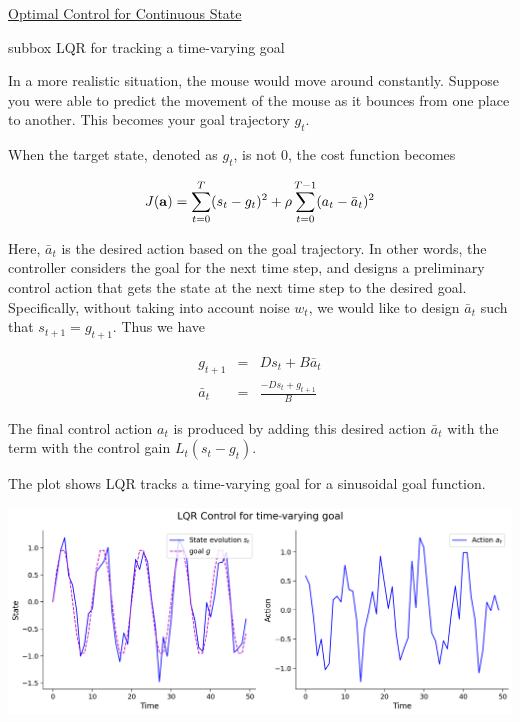\begin{textbox}{\href{https://compneuro.neuromatch.io/tutorials/W3D3_OptimalControl/student/W3D3_Tutorial2.html}{Optimal Control for Continuous State}}


\begin{subbox}{subbox}{ LQR for tracking a time-varying goal}
\scriptsize

In a more realistic situation, the mouse would move around constantly. Suppose you were able to predict the movement of the mouse as it bounces from one place to another. This becomes your goal trajectory $g_t$.

When the target state, denoted as $g_t$, is not $0$, the cost function becomes

\begin{equation*}
J({\bf a}) = \sum_{t = 0}^{T} (s_{t}- g_t) ^2 + \rho \sum_{t=0}^{T-1}(a_{t}-\bar a_t)^2
\end{equation*}

Here, $\bar a_t$ is the desired action based on the goal trajectory. In other words, the controller considers the goal for the next time step, and designs a preliminary control action that gets the state at the next time step to the desired goal. Specifically, without taking into account noise $w_t$, we would like to design $\bar a_t$ such that $s_{t+1}=g_{t+1}$. Thus we have

\begin{eqnarray*}
g_{t+1} &=& Ds_t + B \bar a_t\\
\bar a_{t} &=& \frac{- Ds_t + g_{t+1}}{B}
\end{eqnarray*}

The final control action $a_t$ is produced by adding this desired action $\bar a_t$ with the term with the control gain $L_t(s_t - g_t)$.

The plot shows LQR tracks a time-varying goal for a  sinusoidal goal function.

\begin{center}
\includegraphics[scale=0.2]{Figures/OC/OC_Figure11.png}
\end{center}

\end{subbox}
\end{textbox}
